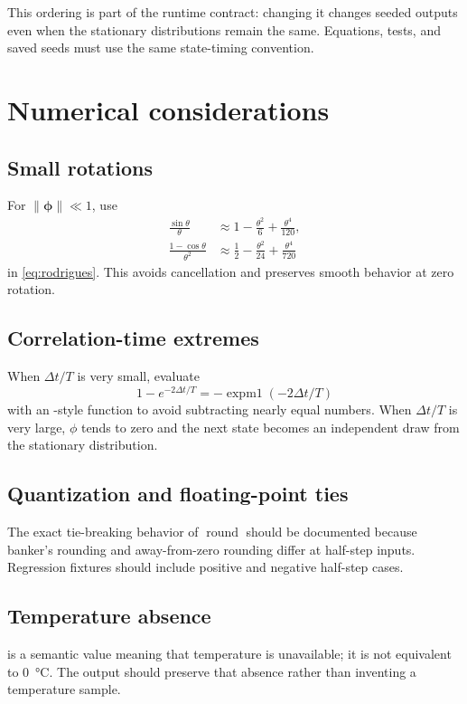 \documentclass[11pt,oneside,headings=big]{scrreprt}
\newcommand{\round}{\operatorname{round}}
\newcommand{\vect}[1]{\bm{#1}}
\begin{document}
    This ordering is part of the runtime contract: changing it changes seeded
    outputs even when the stationary distributions remain the same. Equations,
    tests, and saved seeds must use the same state-timing convention.


    \section{Numerical considerations}

    \subsection{Small rotations}
    For \(\lVert\vect\phi\rVert\ll1\), use
    \begin{align}
        \frac{\sin\theta}{\theta}
        &\approx1-\frac{\theta^2}{6}+\frac{\theta^4}{120},\\
        \frac{1-\cos\theta}{\theta^2}
        &\approx\frac12-\frac{\theta^2}{24}+\frac{\theta^4}{720}
    \end{align}
    in \cref{eq:rodrigues}. This avoids cancellation and preserves smooth behavior
    at zero rotation.

    \subsection{Correlation-time extremes}
    When \(\Delta t/T\) is very small, evaluate
    \begin{equation}
        1-e^{-2\Delta t/T}
        =-\operatorname{expm1}(-2\Delta t/T)
    \end{equation}
    with an -style function to avoid subtracting nearly equal
    numbers. When \(\Delta t/T\) is very large, \(\phi\) tends to zero and the next
    state becomes an independent draw from the stationary distribution.

    \subsection{Quantization and floating-point ties}
    The exact tie-breaking behavior of \(\round\) should be documented because
    banker's rounding and away-from-zero rounding differ at half-step inputs.
    Regression fixtures should include positive and negative half-step cases.

    \subsection{Temperature absence}
     is a semantic value meaning that temperature is unavailable; it
    is not equivalent to \SI{0}{\degreeCelsius}. The output should preserve that
    absence rather than inventing a temperature sample.
\end{document}
